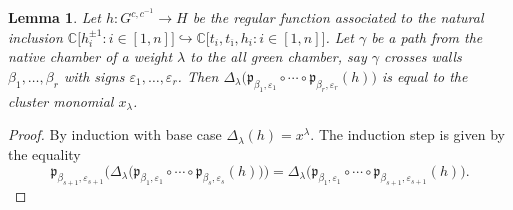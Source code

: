 \documentclass{amsart}
\newtheorem{lemma}[theorem]{Lemma}
\numberwithin{theorem}{section}
\newcommand{\fp}{\mathfrak{p}}
\newcommand{\CC}{\mathbb{C}}
\newcommand{\into}{\hookrightarrow}
\newcommand{\oi}{{\overline{\imath}}}
\begin{document}
    \begin{lemma}
      Let $h:G^{c,c^{-1}}\to H$ be the regular function associated to the natural inclusion $\CC\big[h_i^{\pm1}:i\in[1,n]\big]\into\CC\big[t_i,t_\oi,h_i:i\in[1,n]\big]$.
      Let $\gamma$ be a path from the native chamber of a weight $\lambda$ to the all green chamber, say $\gamma$ crosses walls $\beta_1,\ldots,\beta_r$ with signs $\varepsilon_1,\ldots,\varepsilon_r$.
      Then $\Delta_\lambda\big(\fp_{\beta_1,\varepsilon_1}\circ\cdots\circ\fp_{\beta_r,\varepsilon_r}(h)\big)$ is equal to the cluster monomial $x_\lambda$.
    \end{lemma}
    \begin{proof}
      By induction with base case $\Delta_\lambda(h)=x^\lambda$.
      The induction step is given by the equality
      \[\fp_{\beta_{s+1},\varepsilon_{s+1}}\Big(\Delta_\lambda\big(\fp_{\beta_1,\varepsilon_1}\circ\cdots\circ\fp_{\beta_s,\varepsilon_s}(h)\big)\Big)=\Delta_\lambda\big(\fp_{\beta_1,\varepsilon_1}\circ\cdots\circ\fp_{\beta_{s+1},\varepsilon_{s+1}}(h)\big).\]
    \end{proof}



  
\end{document}
